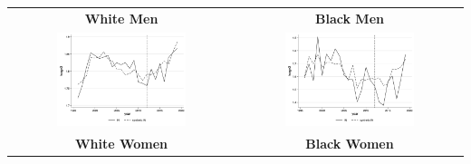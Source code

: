 \documentclass[11pt]{article}
\begin{document}
{\begin{landscape}
\begin{table}[ht!]
\begin{tabular}{c c}
    \end{tabular}
\end{table}
\end{landscape}

\pagebreak
\begin{landscape}
\begin{table}[ht!]
    \centering
    \label{fig:synth_in}
    \begin{tabular}{c c}
          \textbf{White Men} & \textbf{Black Men} \\
          \includegraphics[width = 0.6\textwidth, keepaspectratio]{figures/fin_synth_wm_in.png} & \includegraphics[width = 0.6\textwidth, keepaspectratio]{figures/fin_synth_bm_in.png} \\
          \textbf{White Women} & \textbf{Black Women} \\

\end{tabular}
\end{table}
\end{landscape}}
\end{document}

